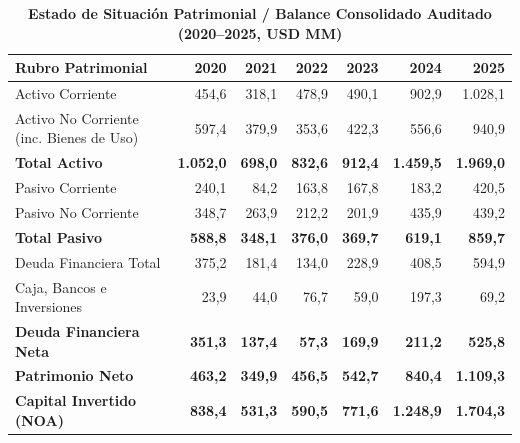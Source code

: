 \documentclass[11pt,a4paper]{article}
\begin{document}
\begin{table}[H]
\centering
\caption{\textbf{Estado de Situación Patrimonial / Balance Consolidado Auditado (2020--2025, USD MM)}}
\scriptsize
\begin{tabularx}{\textwidth}{Xrrrrrr}
\toprule
\textbf{Rubro Patrimonial} & \textbf{2020} & \textbf{2021} & \textbf{2022} & \textbf{2023} & \textbf{2024} & \textbf{2025} \\
\midrule
Activo Corriente & 454,6 & 318,1 & 478,9 & 490,1 & 902,9 & 1.028,1 \\
Activo No Corriente (inc. Bienes de Uso) & 597,4 & 379,9 & 353,6 & 422,3 & 556,6 & 940,9 \\
\textbf{Total Activo} & \textbf{1.052,0} & \textbf{698,0} & \textbf{832,6} & \textbf{912,4} & \textbf{1.459,5} & \textbf{1.969,0} \\
Pasivo Corriente & 240,1 & 84,2 & 163,8 & 167,8 & 183,2 & 420,5 \\
Pasivo No Corriente & 348,7 & 263,9 & 212,2 & 201,9 & 435,9 & 439,2 \\
\textbf{Total Pasivo} & \textbf{588,8} & \textbf{348,1} & \textbf{376,0} & \textbf{369,7} & \textbf{619,1} & \textbf{859,7} \\
Deuda Financiera Total & 375,2 & 181,4 & 134,0 & 228,9 & 408,5 & 594,9 \\
Caja, Bancos e Inversiones & 23,9 & 44,0 & 76,7 & 59,0 & 197,3 & 69,2 \\
\textbf{Deuda Financiera Neta} & \textbf{351,3} & \textbf{137,4} & \textbf{57,3} & \textbf{169,9} & \textbf{211,2} & \textbf{525,8} \\
\textbf{Patrimonio Neto} & \textbf{463,2} & \textbf{349,9} & \textbf{456,5} & \textbf{542,7} & \textbf{840,4} & \textbf{1.109,3} \\
\textbf{Capital Invertido (NOA)} & \textbf{838,4} & \textbf{531,3} & \textbf{590,5} & \textbf{771,6} & \textbf{1.248,9} & \textbf{1.704,3} \\
\bottomrule
\end{tabularx}
\end{table}
\end{document}
